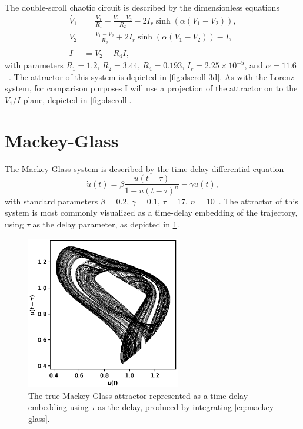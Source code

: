 The double-scroll chaotic circuit is described by the dimensionless equations
\begin{equation}
 \begin{aligned}
   \dot{V_1} &= \frac{V_1}{R_1} - \frac{V_1 - V_2}{R_2} - 2 I_r \sinh\left(\alpha(V_1 - V_2)\right), \\
   \dot{V_2} &= \frac{V_1 - V_2}{R_2} + 2 I_r \sinh\left(\alpha(V_1 - V_2)\right) - I, \\
   \dot{I} &= V_2 - R_4 I,
 \end{aligned}
 \label{eq:dscroll}
\end{equation}
with parameters $R_1 = 1.2$, $R_2 = 3.44$, $R_4 = 0.193$, $I_r = 2.25
\times 10^{-5}$, and $\alpha = 11.6$~\cite{gauthier1996}. The
attractor of this system is depicted in \cref{fig:dscroll-3d}. As
with the Lorenz system, for comparison purposes I will use a
projection of the attractor on to the $V_1$/$I$ plane, depicted in
\cref{fig:dscroll}.

\section{Mackey-Glass}\label{sec:mackey-glass}

The Mackey-Glass system is described by the time-delay differential equation
\begin{equation}
  \dot{u}(t) = \beta \frac{u(t - \tau)}{1 + u(t - \tau)^n} - \gamma u(t),
  \label{eq:mackey-glass}
\end{equation}
with standard parameters $\beta = 0.2$, $\gamma = 0.1$, $\tau = 17$,
$n = 10$~\cite{mackey1977}. The attractor of this system is most
commonly visualized as a time-delay embedding of the trajectory, using
$\tau$ as the delay parameter, as depicted in \cref{fig:mackey-glass}.

\begin{figure}
  \includegraphics[width=0.6\textwidth]{figures/mackey-glass}
  \caption{The true Mackey-Glass attractor represented as a time delay embedding using $\tau$ as the delay, produced by integrating \cref{eq:mackey-glass}.}%
  \label{fig:mackey-glass}
\end{figure}
